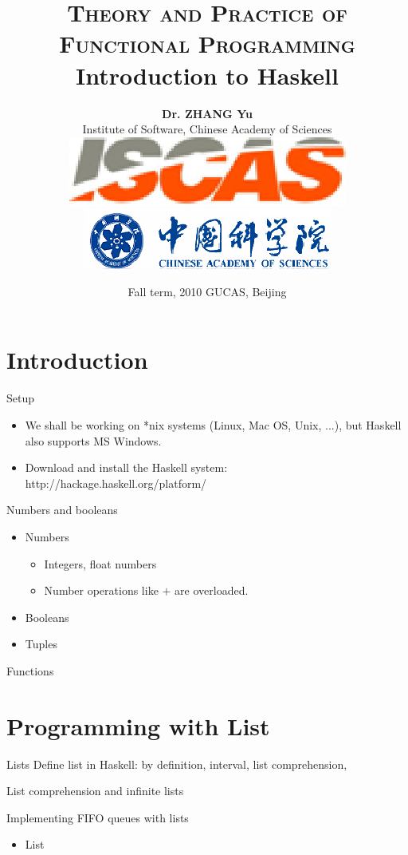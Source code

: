\documentclass[paper=screen,mode=present,style=zysimple]{powerdot}
\title{{\small \textsc{Theory and Practice of Functional Programming}}
\\[12pt]
{\Large \color{TitleColor} Introduction to Haskell}
}
\author{\small \textbf{Dr. ZHANG Yu}
  \\[2pt] \small Institute of Software, Chinese Academy of Sciences 
  \\[5pt] \includegraphics[height=.04\slideheight]{iscas.eps} 
  \qquad \qquad 
  \includegraphics[height=.04\slideheight]{cas.eps}
}
\date{\scriptsize Fall term, 2010 \qquad GUCAS, Beijing}
\begin{document}
\maketitle 

\section{Introduction}

\begin{slide}{Setup}
\begin{itemize}
\item We shall be working on *nix systems (Linux, Mac OS, Unix, ...), but Haskell also supports MS Windows.
\item Download and install the Haskell system: http://hackage.haskell.org/platform/
\end{itemize}
\end{slide}

\begin{slide}{Numbers and booleans}
\begin{itemize}
\item Numbers
\begin{itemize}
\item Integers, float numbers
\item Number operations like $+$ are overloaded. 
\end{itemize}
\item Booleans
\item Tuples
\end{itemize}
\end{slide}

\begin{slide}{Functions}

\end{slide}

\section{Programming with List}

\begin{slide}{Lists}
Define list in Haskell: by definition, interval, list comprehension, 
\end{slide}

\begin{slide}{List comprehension and infinite lists}

\end{slide}

\begin{slide}{Implementing FIFO queues with lists}
\begin{itemize}
\item List
\end{itemize}
\end{slide}
\end{document}
